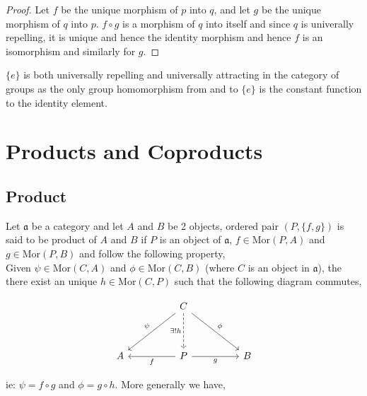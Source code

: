 \documentclass[11pt,a4paper]{colorart}
\def\mab{\mathfrak}
\def\oo{\circ}
\def\ra{\rightarrow}
\begin{document}
\begin{proof}
	Let $f$ be the unique morphism of $p$ into $q$, and let $g$ be the unique morphism of $q$ into $p$. $f \oo g$ is a morphism of $q$ into itself and since $q$ is univerally repelling, it is unique and hence the identity morphism and hence $f$ is an isomorphism and similarly for $g$.
\end{proof}

\begin{example}
	$\{e\}$ is both universally repelling and universally attracting in the category of groups as the only group homomorphism from and to $\{e\}$ is the constant function to the identity element.
\end{example}



\section{Products and Coproducts}

\subsection{Product}

\begin{definition}
	Let $\mab{a}$ be a category and let $A$ and $B$ be 2 objects, ordered pair $(P,\{f,g\})$ is said to be product of $A$ and $B$ if $P$ is an object of $\mab{a}$, $f \in \text{Mor}(P,A)$ and $g \in \text{Mor}(P,B)$ and follow the following property,\\

	Given $\psi \in \text{Mor}(C,A)$ and $\phi \in \text{Mor}(C,B)$ (where $C$ is an object in $\mab{a}$), the there exist an unique $h \in \text{Mor}(C,P)$ such that the following diagram commutes,

\[\begin{tikzcd}
	&& C \\
	\\
	A && P && B
	\arrow["g"', from=3-3, to=3-5]
	\arrow["\phi", from=1-3, to=3-5]
	\arrow["{\exists !h}"', dashed, from=1-3, to=3-3]
	\arrow["\psi"', from=1-3, to=3-1]
	\arrow["f", from=3-3, to=3-1]
\end{tikzcd}\]


ie: $\psi = f \oo g$ and $\phi = g \oo h$. More generally we have,

\end{definition}
\end{document}

